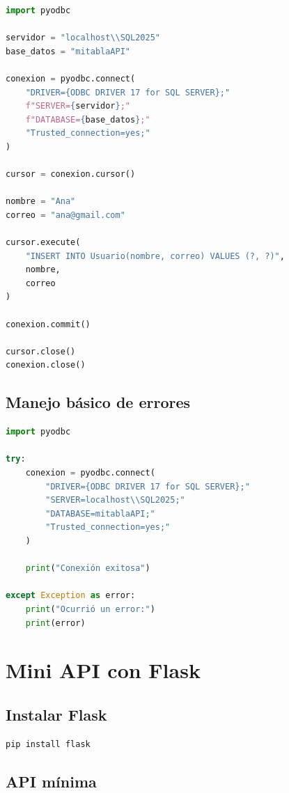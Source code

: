 \documentclass[12pt]{article}
\begin{document}
\begin{lstlisting}[language=Python]
import pyodbc

servidor = "localhost\\SQL2025"
base_datos = "mitablaAPI"

conexion = pyodbc.connect(
    "DRIVER={ODBC DRIVER 17 for SQL SERVER};"
    f"SERVER={servidor};"
    f"DATABASE={base_datos};"
    "Trusted_connection=yes;"
)

cursor = conexion.cursor()

nombre = "Ana"
correo = "ana@gmail.com"

cursor.execute(
    "INSERT INTO Usuario(nombre, correo) VALUES (?, ?)",
    nombre,
    correo
)

conexion.commit()

cursor.close()
conexion.close()
\end{lstlisting}

\subsection{Manejo básico de errores}

\begin{lstlisting}[language=Python]
import pyodbc

try:
    conexion = pyodbc.connect(
        "DRIVER={ODBC DRIVER 17 for SQL SERVER};"
        "SERVER=localhost\\SQL2025;"
        "DATABASE=mitablaAPI;"
        "Trusted_connection=yes;"
    )

    print("Conexión exitosa")

except Exception as error:
    print("Ocurrió un error:")
    print(error)
\end{lstlisting}

\section{Mini API con Flask}

\subsection{Instalar Flask}

\begin{lstlisting}
pip install flask
\end{lstlisting}

\subsection{API mínima}
\end{document}
